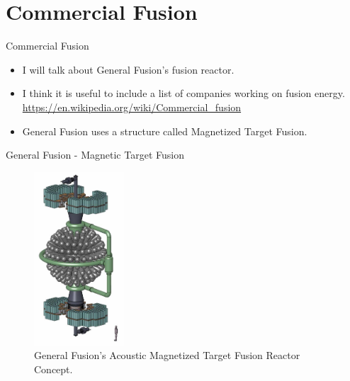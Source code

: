 \section{Commercial Fusion}
\begin{frame}{Commercial Fusion}
    \begin{itemize}
        \item I will talk about General Fusion's fusion reactor.
        \item I think it is useful to include a list of companies working on fusion energy.
              \url{https://en.wikipedia.org/wiki/Commercial_fusion}
        \item General Fusion uses a structure called Magnetized Target Fusion.
    \end{itemize}
\end{frame}

\begin{frame}{General Fusion - Magnetic Target Fusion}
    \begin{figure}
        \centering
        \includegraphics[width=0.3\textwidth]{figures/gf-structure.png}
        \caption{\cite{DelageM.2012PtaM} General Fusion's Acoustic Magnetized Target Fusion Reactor Concept.}
    \end{figure}
\end{frame}

